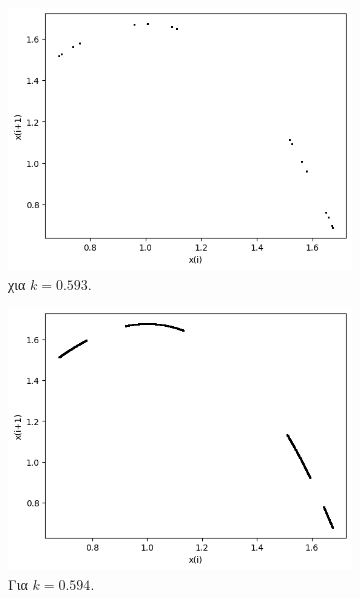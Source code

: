 \begin{figure}[h!]
\centering
	\begin{subfigure}[b]{0.4\textwidth}
		\centering
		\includegraphics[width=\textwidth]{LateX images/graphs q07/g8}
		\caption{χια $k=0.593$.}
		\label{f:k42}
	\end{subfigure}
	\hfill
	\begin{subfigure}[b]{0.4\textwidth}
		\centering
		\includegraphics[width=\textwidth]{LateX images/graphs q07/g9}
		\caption{Για $k=0.594$.}
		\label{f:k43}
	\end{subfigure}
	\hfill
	\begin{subfigure}[b]{0.4\textwidth}
		\centering

\end{subfigure}
\end{figure}
